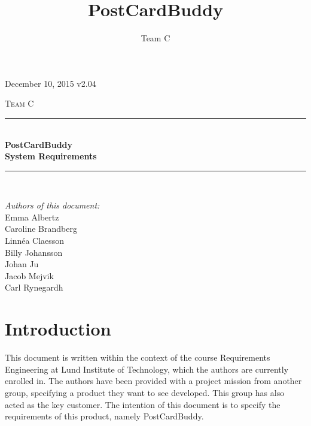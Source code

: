 \documentclass[10pt,a4paper]{article}
\title{PostCardBuddy}
\author{Team C}
\begin{document}
\begin{titlepage}
\newcommand{\HRule}{\rule{\linewidth}{0.5mm}}


\begin{flushright}
December 10, 2015 v2.04\\[3cm]
\end{flushright}


\centering
\textsc{\LARGE Team C}\\[0.5cm]

\HRule \\[0.4cm]
{ \huge \bfseries PostCardBuddy}\\[0.3cm]
{\Large \bfseries System Requirements}\\[0.4cm] %
\HRule \\[1.5cm]

\vfill
\begin{flushleft}
\textit{Authors of this document:}\\
Emma Albertz\\
Caroline Brandberg\\
Linnéa Claesson\\
Billy Johansson\\
Johan Ju\\
Jacob Mejvik\\
Carl Rynegardh
\end{flushleft}

\end{titlepage}



%



\setcounter{tocdepth}{2}
\tableofcontents
\newpage
{}

\section{Introduction}
This document is written within the context of the course Requirements Engineering at Lund Institute of Technology, which the authors are currently enrolled in. The authors have been provided with a project mission from another group, specifying a product they want to see developed. This group has also acted as the key customer. The intention of this document is to specify the requirements of this product, namely PostCardBuddy.
\end{document}
